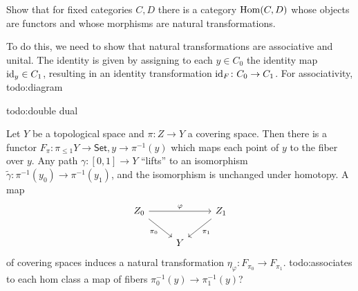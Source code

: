 \begin{example}
    Show that for fixed categories $C,D$ there is a category $\operatorname{Hom}(C,D)$ whose objects are functors and whose morphisms are natural transformations.

    To do this, we need to show that natural transformations are associative and unital. The identity is given by assigning to each $y \in C_0$ the identity map $\operatorname{id}_y \in C_1$, resulting in an identity transformation $\operatorname{id}_F \colon C_0 \to C_1$. For associativity, {\color{red}todo:diagram} 
\end{example}

\begin{example}
    {\color{red}todo:double dual} 
\end{example}
\begin{example}
    Let $Y$ be a topological space and $\pi \colon Z \to Y$ a covering space. Then there is a functor $F_{\pi} \colon \pi_{\leq 1}Y \to \mathsf{Set} , y \to  \pi ^{-1}(y)$ which maps each point of $y$ to the fiber over $y$. Any path $\gamma  \colon [0,1] \to Y$ ``lifts'' to an isomorphism $\widetilde {\gamma } \colon \pi ^{-1}(y_0) \to \pi ^{-1}(y_1)$, and the isomorphism is unchanged under homotopy. A map \[
    \begin{tikzcd}
Z_0 \arrow[rr, "\varphi"] \arrow[rd, "\pi_0"'] &   & Z_1 \arrow[ld, "\pi_1"] \\
                                               & Y &                        
\end{tikzcd}
    \] of covering spaces induces a natural transformation $\eta _{\varphi }\colon F_{\pi_0} \to F_{\pi_1}$. {\color{red}todo:associates to each hom class a map of fibers $\pi_0 ^{-1}(y) \to \pi_1^{-1}(y)$?} 
\end{example}

